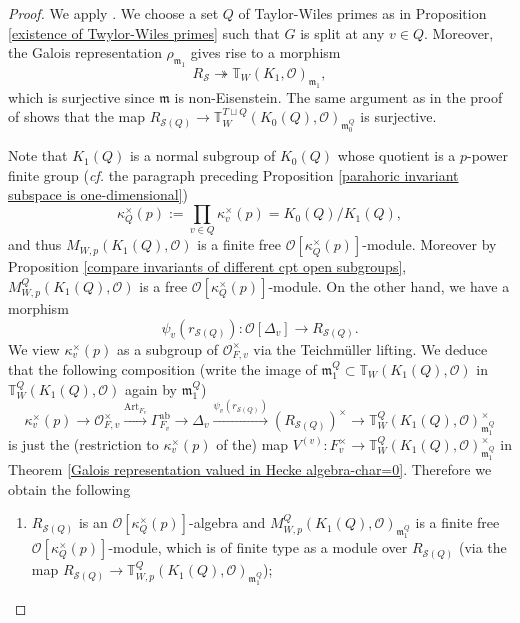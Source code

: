 \documentclass[12pt,oneside,reqno]{amsart}
\theoremstyle{plain}
\begin{document}
	\begin{proof}
		We apply
		\cite[Theorem 1.1]{Brochard2017}. We choose a set $Q$
		of
		Taylor-Wiles primes
		as in
		Proposition
		\ref{existence of Twylor-Wiles primes}
		such that
		$G$ is split at any $v\in Q$.
		Moreover, the Galois representation $\rho_{\mathfrak{m}_1}$ gives rise to
		a morphism
		\[
		R_{\mathcal{S}}
		\twoheadrightarrow
		\mathbb{T}_W
		(K_1,\mathcal{O})_{\mathfrak{m}_1},
		\]
		which is surjective since $\mathfrak{m}$ is non-Eisenstein. The same argument as in the proof of \cite[Theorem 3.5.1]{ClozelHarrisTaylor2008} shows that the map $R_{\mathcal{S}(Q)}\to\mathbb{T}_W^{T\sqcup Q}(K_0(Q),\mathcal{O})_{\mathfrak{m}_0^Q}$ is surjective.
		
		
		
		
		Note that
		$K_1(Q)$
		is a normal subgroup of
		$K_0(Q)$
		whose quotient is
		a $p$-power finite group
		(\emph{cf.} the paragraph preceding
		Proposition \ref{parahoric invariant subspace is one-dimensional})
		\[
		\kappa_Q^\times(p):=
		\prod_{v\in Q}
		\kappa_v^\times(p)
		=
		K_0(Q)/K_1(Q),
		\]
		and thus
		$M_{W,p}
		(K_1(Q),\mathcal{O})$
		is a finite free
		$\mathcal{O}[\kappa_Q^\times(p)]$-module.
		Moreover by
		Proposition
		\ref{compare invariants of different cpt open subgroups},
		$M_{W,p}^Q(K_1(Q),\mathcal{O})$
		is a free
		$\mathcal{O}[\kappa_Q^\times(p)]$-module.
		On the other hand,
		we have a morphism
		\[
		\psi_v(r_{\mathcal{S}(Q)})
		\colon
		\mathcal{O}[\Delta_v]
		\rightarrow
		R_{\mathcal{S}(Q)}.
		\]
		We view
		$\kappa_v^\times(p)$
		as a subgroup of
		$\mathcal{O}_{F,v}^\times$
		via the Teichmüller lifting. We deduce that the following composition
		(write the image of
		$\mathfrak{m}_1^Q
		\subset
		\mathbb{T}_W(K_1(Q),\mathcal{O})$
		in
		$\mathbb{T}_W^{Q}(K_1(Q),\mathcal{O})$
		again by $\mathfrak{m}_1^Q$)
		\[
		\kappa_v^\times(p)
		\rightarrow
		\mathcal{O}_{F,v}^\times
		\xrightarrow{\mathrm{Art}_{F_v}}
		\Gamma_{F_v}^\mathrm{ab}
		\rightarrow
		\Delta_v
		\xrightarrow{\psi_v(r_{\mathcal{S}(Q)})}
		(R_{\mathcal{S}(Q)})^\times
		\rightarrow
		\mathbb{T}_W^{Q}(K_1(Q),\mathcal{O})_{\mathfrak{m}_1^Q}^\times
		\]
		is just the (restriction to $\kappa_v^\times(p)$ of the) map
		$V^{(v)}
		\colon
		F_v^\times
		\rightarrow
		\mathbb{T}_W^{Q}(K_1(Q),\mathcal{O})_{\mathfrak{m}_1^Q}^\times$
		in
		Theorem
		\ref{Galois representation valued in Hecke algebra-char=0}.
		Therefore we obtain the following
		\begin{enumerate}
			\item 
			$R_{\mathcal{S}(Q)}$
			is an
			$\mathcal{O}[\kappa_Q^\times(p)]$-algebra
			and
			$M_{W,p}^Q(K_1(Q),\mathcal{O})_{\mathfrak{m}_1^Q}$
			is a finite free
			$\mathcal{O}[\kappa_Q^\times(p)]$-module,
			which is
			of finite type as a module over
			$R_{\mathcal{S}(Q)}$
			(via the map
			$R_{\mathcal{S}(Q)}
			\rightarrow
			\mathbb{T}_{W,p}^{Q}(K_1(Q),\mathcal{O})_{\mathfrak{m}_1^Q}$);
			

\end{enumerate}
\end{proof}
\end{document}
